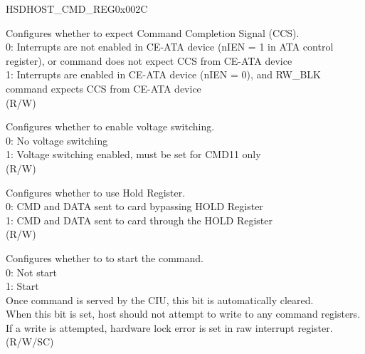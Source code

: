 \addtocounter{Regfloat}{-1}
\begin{register}{H}{SDHOST\_CMD\_REG}{0x002C}
\begin{regdesc}\begin{reglist}
\item [Continued from the previous page...]
\label{fielddesc:SDHOSTCCSEXPECTED}\item [SDHOST\_CCS\_EXPECTED] Configures whether to expect Command Completion Signal (CCS).\\
0: Interrupts are not enabled in CE-ATA device (nIEN = 1 in ATA control register), or command does not expect CCS from CE-ATA device\\
1: Interrupts are enabled in CE-ATA device (nIEN = 0), and RW\_BLK command expects CCS from CE-ATA device\\
(R/W)
\label{fielddesc:SDHOSTVOLTSWITCH}\item [SDHOST\_VOLT\_SWITCH] Configures whether to enable voltage switching.\\
0: No voltage switching\\
1: Voltage switching enabled, must be set for CMD11 only\\(R/W)
\label{fielddesc:SDHOSTUSEHOLEREG}\item [SDHOST\_USE\_HOLE\_REG] Configures whether to use Hold Register.\\
0: CMD and DATA sent to card bypassing HOLD Register\\
1: CMD and DATA sent to card through the HOLD Register\\ (R/W)
\label{fielddesc:SDHOSTSTARTCMD}\item [SDHOST\_START\_CMD] Configures
 whether to to start the command.\\
 0: Not start\\
 1: Start\\
 Once command is served by the CIU, this bit is automatically cleared.\\ When this bit is set, host should not attempt to write to any command registers. If a write is attempted, hardware lock error is set in raw interrupt register. (R/W/SC)
\end{reglist}\end{regdesc}
\end{register}


